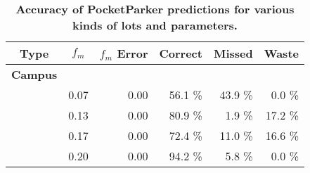\begin{table}[t!]
\begin{threeparttable}
{\small
\begin{tabularx}{\columnwidth}{Xrrrrr}
\multicolumn{1}{c}{\textbf{Type}} & 
\multicolumn{1}{c}{\textbf{$f_m$}} & 
\multicolumn{1}{c}{\textbf{$f_m$ Error}} & 
\multicolumn{1}{c}{\textbf{Correct}} & 
\multicolumn{1}{c}{\textbf{Missed}} & 
\multicolumn{1}{c}{\textbf{Waste}}\\ \toprule

\textbf{Campus} & & & & & \\
\midrule
& 0.07 & 0.00 & 56.1 \% & 43.9 \% & 0.0 \% \\
& 0.13 & 0.00 & 80.9 \% & 1.9 \% & 17.2 \% \\
& 0.17 & 0.00 & 72.4 \% & 11.0 \% & 16.6 \% \\
& 0.20 & 0.00 & 94.2 \% & 5.8 \% & 0.0 \% \\
\end{tabularx}
}
\caption{\textbf{Accuracy of PocketParker predictions for various kinds of lots and parameters.}}
\label{table-accuracy}
\end{threeparttable}
\end{table}
